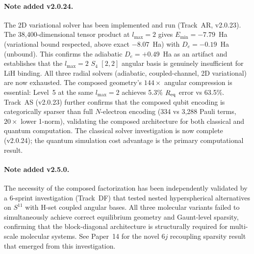 \documentclass[aps,pra,twocolumn,superscriptaddress,longbibliography,floatfix]{revtex4-2}
\begin{document}
\paragraph{Note added v2.0.24.}
The 2D variational solver has been implemented and run (Track~AR,
v2.0.23).  The 38{,}400-dimensional tensor product at $l_{\max} = 2$
gives $E_{\min} = -7.79$~Ha (variational bound respected, above
exact $-8.07$~Ha) with $D_e = -0.19$~Ha (unbound).  This confirms
the adiabatic $D_e = +0.49$~Ha as an artifact and establishes that
the $l_{\max} = 2$ $S_4$ $[2,2]$ angular basis is genuinely
insufficient for LiH binding.  All three radial solvers (adiabatic,
coupled-channel, 2D variational) are now exhausted.  The composed
geometry's $144{\times}$ angular compression is essential: Level~5 at
the same $l_{\max} = 2$ achieves 5.3\% $R_{\rm eq}$ error vs
63.5\%.  Track~AS (v2.0.23) further confirms that the composed
qubit encoding is categorically sparser than full $N$-electron
encoding (334 vs 3{,}288 Pauli terms, $20{\times}$ lower 1-norm),
validating the composed architecture for both classical and quantum
computation.  The classical solver investigation is now complete
(v2.0.24); the quantum simulation cost advantage is the primary
computational result.

\paragraph{Note added v2.5.0.}
The necessity of the composed factorization has been independently
validated by a 6-sprint investigation (Track~DF) that tested nested
hyperspherical alternatives on $S^{11}$ with H-set coupled angular
bases.  All three molecular variants failed to simultaneously achieve
correct equilibrium geometry and Gaunt-level sparsity, confirming that
the block-diagonal architecture is structurally required for
multi-scale molecular systems.  See Paper~14 for the novel 6$j$
recoupling sparsity result that emerged from this investigation.
\end{document}
